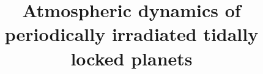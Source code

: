 \documentclass[trackchanges,twocolumn]{aastex7}
\begin{document}
\title{Atmospheric dynamics of periodically irradiated tidally locked planets}

\end{document}
